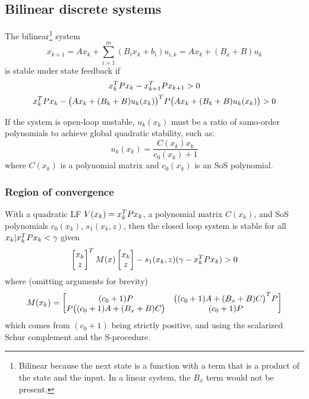 \subsection{Bilinear discrete systems}
The bilinear\footnote{Bilinear because the next state is a function with a term that is a product of the state and the input. In a linear system, the $B_x$ term would not be present.} system
%
\begin{equation}
  x_{k+1} = A x_k + \sum_{i=1}^m (B_i x_k + b_i) u_{i,k} = A x_k + (B_x + B) u_k
\end{equation}
%
is stable under state feedback if
%
\begin{gather}
  x_k^{T} P x_k - x_{k+1}^{T} P x_{k+1} > 0 \\
  x_k^{T} P x_k
  -
  \big(
    A x_k + (B_k + B) u_k(x_k)
  \big)^{T}
  P
  \big(
    A x_k + (B_k + B) u_k(x_k)
  \big)
  > 0
\end{gather}

If the system is open-loop unstable, $u_k(x_k)$ must be a ratio of samo-order polynomials to achieve global quadratic stability, such as:
%
\begin{equation}
  u_k(x_k) = \frac{C(x_k) x_k}{c_0(x_k) + 1}
\end{equation}
%
where $C(x_k)$ is a polynomial matrix and $c_0(x_k)$ is an SoS polynomial.

\subsubsection{Region of convergence}
With a quadratic LF $V(x_k) = x_k^{T} P x_k$, a polynomial matrix $C(x_k)$, and SoS polynomials $c_0(x_k)$, $s_1(x_k,z)$, then the closed loop system is stable for all $x_k | x_k^{T} P x_k < \gamma$ given
%
\begin{equation}
  \begin{bmatrix} x_k \\ z \end{bmatrix}^{T}
  M(x)
  \begin{bmatrix} x_k \\ z \end{bmatrix}
  -
  s_1(x_k,z) (\gamma - x_k^{T} P x_k) > 0
\end{equation}
%
where (omitting arguments for brevity)
%
\begin{equation}\label{eq:polynomial-matrix-convergence}
  M(x_k) =
  \begin{bmatrix}
    (c_0 + 1) P & \big( (c_0 + 1)A + (B_x + B)C \big)^{T} P \\
    P \big( (c_0 + 1)A + (B_x + B)C \big) & (c_0 + 1)P
  \end{bmatrix}
\end{equation}
%
which comes from $(c_0 + 1)$ being strictly positive, and using the scalarized Schur complement and the S-procedure.

